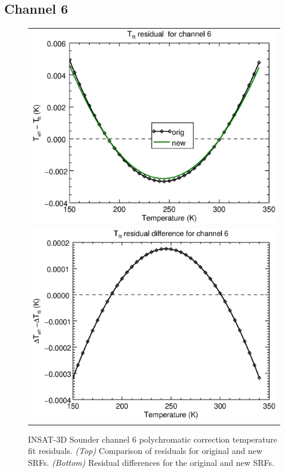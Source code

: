 \subsection{Channel 6}
\begin{figure}[H]
  \centering
  \begin{tabular}{c}
    \includegraphics[scale=0.55]{graphics/sndr/tfit/sndr_insat3d-6.tfit.eps} \\
    \includegraphics[scale=0.55]{graphics/sndr/tfit/sndr_insat3d-6.tfit.difference.eps}
  \end{tabular}
  \caption{INSAT-3D Sounder channel 6 polychromatic correction temperature fit residuals. \emph{(Top)} Comparison of residuals for original and new SRFs. \emph{(Bottom)} Residual differences for the original and new SRFs.}
  \label{fig:sndr_ch6_tfit}
\end{figure}

